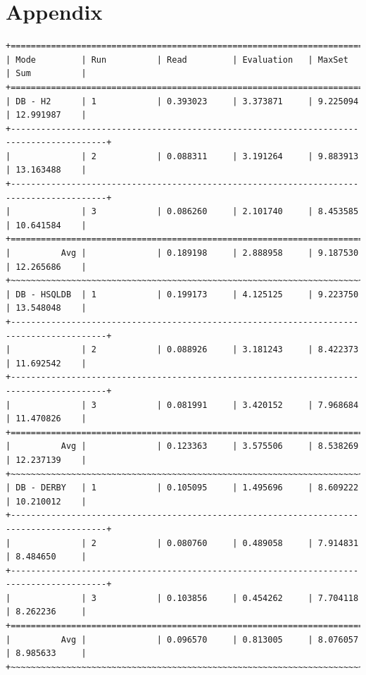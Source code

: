\documentclass[draft,final]{vutinfth} %
\begin{document}
\chapter*{Appendix}

\begin{lstlisting}[basicstyle=\tiny,caption={Benchmark DB \textbf{ohne} Indizes, Datei: lubm-ex-20-15.sparql.xml},label={lst:dboi15}]
+=========================================================================================+
| Mode         | Run          | Read         | Evaluation   | MaxSet       | Sum          | 
+=========================================================================================+
| DB - H2      | 1            | 0.393023     | 3.373871     | 9.225094     | 12.991987    | 
+-----------------------------------------------------------------------------------------+
|              | 2            | 0.088311     | 3.191264     | 9.883913     | 13.163488    | 
+-----------------------------------------------------------------------------------------+
|              | 3            | 0.086260     | 2.101740     | 8.453585     | 10.641584    | 
+=========================================================================================+
|          Avg |              | 0.189198     | 2.888958     | 9.187530     | 12.265686    | 
+~~~~~~~~~~~~~~~~~~~~~~~~~~~~~~~~~~~~~~~~~~~~~~~~~~~~~~~~~~~~~~~~~~~~~~~~~~~~~~~~~~~~~~~~~+
| DB - HSQLDB  | 1            | 0.199173     | 4.125125     | 9.223750     | 13.548048    | 
+-----------------------------------------------------------------------------------------+
|              | 2            | 0.088926     | 3.181243     | 8.422373     | 11.692542    | 
+-----------------------------------------------------------------------------------------+
|              | 3            | 0.081991     | 3.420152     | 7.968684     | 11.470826    | 
+=========================================================================================+
|          Avg |              | 0.123363     | 3.575506     | 8.538269     | 12.237139    | 
+~~~~~~~~~~~~~~~~~~~~~~~~~~~~~~~~~~~~~~~~~~~~~~~~~~~~~~~~~~~~~~~~~~~~~~~~~~~~~~~~~~~~~~~~~+
| DB - DERBY   | 1            | 0.105095     | 1.495696     | 8.609222     | 10.210012    | 
+-----------------------------------------------------------------------------------------+
|              | 2            | 0.080760     | 0.489058     | 7.914831     | 8.484650     | 
+-----------------------------------------------------------------------------------------+
|              | 3            | 0.103856     | 0.454262     | 7.704118     | 8.262236     | 
+=========================================================================================+
|          Avg |              | 0.096570     | 0.813005     | 8.076057     | 8.985633     | 
+~~~~~~~~~~~~~~~~~~~~~~~~~~~~~~~~~~~~~~~~~~~~~~~~~~~~~~~~~~~~~~~~~~~~~~~~~~~~~~~~~~~~~~~~~+

\end{lstlisting}
\end{document}
